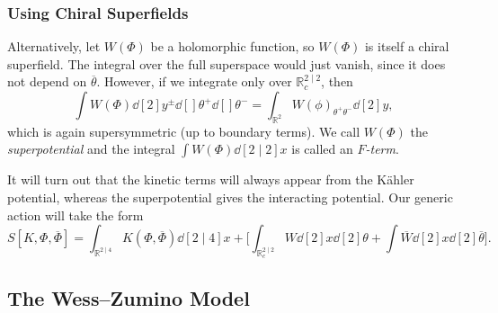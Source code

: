 \subsubsection*{Using Chiral Superfields}%

Alternatively, let $W(\Phi)$ be a holomorphic function, so $W(\Phi)$ is itself a chiral superfield.
The integral over the full superspace would just vanish, since it does not depend on $\overline{\theta}{}$.
However, if we integrate only over $\mathbb{R}^{2 \mid 2}_c$, then
\begin{equation}
  \int W (\Phi) \dd[2]{y^{\pm}} \dd[]{\theta^+} \dd[]{\theta^-} = \int_{\mathbb{R}^2} W(\phi)_{\theta^+ \theta^-} \dd[2]{y},
\end{equation}
which is again supersymmetric (up to boundary terms).
We call $W(\Phi)$ the \emph{superpotential} and the integral $\int W(\Phi) \dd[2 \mid 2]{x}$ is called an \emph{$F$-term}.

It will turn out that the kinetic terms will always appear from the Kähler potential, whereas the superpotential gives the interacting potential.
Our generic action will take the form
\begin{equation}
  S[K, \Phi, \overline{\Phi}{}] = \int_{\mathbb{R}^{2 \mid 4}} K (\Phi, \overline{\Phi}{}) \dd[2 \mid 4]{x} 
  + \biggl[\int_{\mathbb{R}^{2 \mid 2}_c} W \dd[2]{x} \dd[2]{\theta} + \int \overline{W}{} \dd[2]{x} \dd[2]{\overline{\theta}}\biggr].
\end{equation}

\subsection{The Wess--Zumino Model}%
\label{sub:the_wess_zumino_model}

